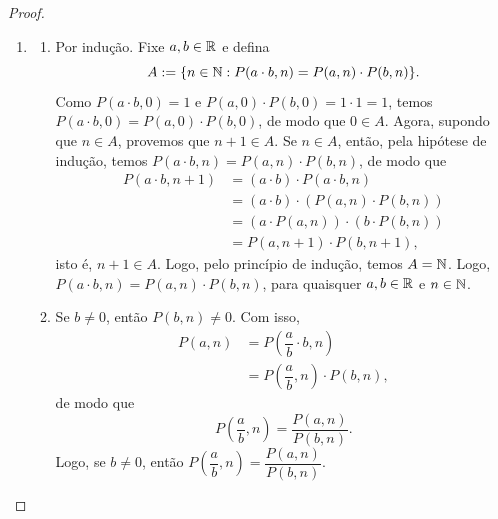 \begin{proof}
\begin{enumerate}[leftmargin=*, align=left, label=\textbf{(\alph*)}]
\begin{enumerate}[label=\roman*.]
\begin{align*}
                            &= P(a,m + m \cdot n) \\
                            &= P(a,m \cdot (n+1)),
                        \end{align*}
                    isto é, $n+1 \in A$. Logo, pelo princípio de indução, temos $A = \N$. Logo, $P(P(a,m),n) = P(a,m \cdot n)$, para quaisquer $a \in \R$ e $m,n \in \N$. Por fim, observando que
                        \[
                            P(P(a,n),m) = P(a,n \cdot m) = P(a,m \cdot n) = P(P(a,m),n),
                        \]
                    temos que $P(P(a,m),n) = P(a,m \cdot n) = P(P(a,n),m)$, para quaisquer $a \in \R$ e $m,n \in \N$.
                \end{enumerate}
            \blackproof
            \item 
                \begin{enumerate}[label=\roman*.]
                    \item Por indução. Fixe $a,b \in \mathbb{R}$ e defina
                        \[
                            A := \{n \in \mathbb{N} : P(a \cdot b,n) = P(a,n) \cdot P(b,n)\}.
                        \]
                    Como $P(a \cdot b,0) = 1$ e $P(a,0) \cdot P(b,0) = 1 \cdot 1 = 1$, temos $P(a \cdot b,0) = P(a,0) \cdot P(b,0)$, de modo que $0 \in A$. Agora, supondo que $n \in A$, provemos que $n+1 \in A$. Se $n \in A$, então, pela hipótese de indução, temos $P(a \cdot b,n) = P(a,n) \cdot P(b,n)$, de modo que
                        \begin{align*}
                            P(a \cdot b,n+1) &= (a \cdot b) \cdot P(a \cdot b,n) \\
                            &= (a \cdot b) \cdot (P(a,n) \cdot P(b,n)) \\
                            &= (a \cdot P(a,n)) \cdot (b \cdot P(b,n)) \\
                            &= P(a,n+1) \cdot P(b,n+1),
                        \end{align*}
                    isto é, $n+1 \in A$. Logo, pelo princípio de indução, temos $A = \N$. Logo, $P(a \cdot b,n) = P(a,n) \cdot P(b,n)$, para quaisquer $a,b \in \mathbb{R}$ e $n \in \mathbb{N}$.
                    \item Se $b \neq 0$, então $P(b,n) \neq 0$. Com isso,
                        \begin{align*}
                            P(a,n) &= P\left(\dfrac{a}{b} \cdot b,n\right) \\
                            &= P\left(\dfrac{a}{b},n\right) \cdot P(b,n),
                        \end{align*}
                    de modo que
                        \[
                            P\left(\dfrac{a}{b},n\right) = \dfrac{P(a,n)}{P(b,n)}.
                        \]
                    Logo, se $b \neq 0$, então $P\left(\dfrac{a}{b},n\right) = \dfrac{P(a,n)}{P(b,n)}$.
                \end{enumerate}
            \blackproof
        \end{enumerate}
\end{proof}

